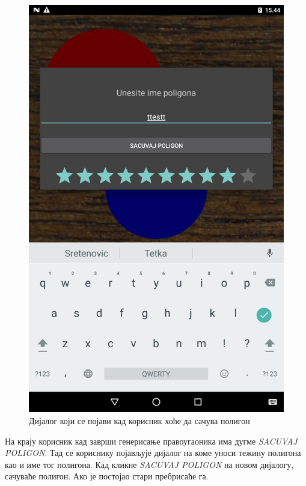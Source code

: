 \begin{figure}[htb!]
\begin{center}
\includegraphics[scale=.1]{pictures/createPolygon/Save}
\caption{Дијалог који се појави кад корисник хоће да сачува полигон}\label{fig:createPolygonSave}
\end{center}
\end{figure}
На крају корисник кад заврши генерисање правоугаоника има дугме \emph{SACUVAJ POLIGON}. Тад се кориснику појављује дијалог на коме уноси тежину полигона као и име тог полигона. Кад кликне \emph{SACUVAJ POLIGON} на новом дијалогу, сачуваће полигон. Ако је постојао стари пребрисаће га.


